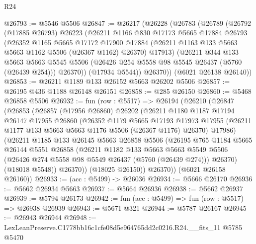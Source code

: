 \begin{lexlean}{R24}
\begin{coremodule}
@26793 := @5546 @5506
@26847 := @26217
    (@26228
      (@26783
        (@26789
          (@26792
            (@17885 @26793)
            @26223
            (@26211
              @1166
              @830
              @17173
              @5665
              @17884
              @26793
              (@26352
                @1165
                @5665
                @17172
                @17900
                @17884
                (@26211 @1163 @133 @5663 @5663 @1162 @5506 (@26367 @1162) @26370)
                @17913)
              (@26211
                @344
                @133
                @5663
                @5663
                @5545
                @5506
                (@26426 @254 @5558 @98 @5545 @26437 (@5760 (@26439 @254)))
                @26370))
            (@17934 @5544))
          @26370))
      (@6021 @26138 @26140))
@26853 := @26211 @1189 @133 @26152 @5663 @26202 @5506
@26857 := @26195 @436 @1188 @26148 @26151
@26858 := @285 @26150
@26860 := @5468 @26858 @5506
@26932 := fun (row : @5517) =>
  @26194
    (@26210
      (@26847
        (@26853
          (@26857
            (@17956 @26860)
            @26202
            (@26211
              @1180
              @1187
              @17194
              @26147
              @17955
              @26860
              (@26352
                @1179
                @5665
                @17193
                @17973
                @17955
                (@26211 @1177 @133 @5663 @5663 @1176 @5506 (@26367 @1176) @26370)
                @17986)
              (@26211
                @1185
                @133
                @26145
                @5663
                @26858
                @5506
                (@26195
                  @765
                  @1184
                  @5665
                  @26144
                  @5551
                  @26858
                  (@26211
                    @1182
                    @133
                    @5663
                    @5663
                    @5549
                    @5506
                    (@26426 @274 @5558 @98 @5549 @26437 (@5760 (@26439 @274)))
                    @26370)
                  (@18018 @5548))
                @26370))
            (@18025 @26150))
          @26370))
      (@6021 @26158 @26160))
@26933 := (acc : @5499) -> @26036
@26934 := @5666 @26170
@26936 := @5662 @26934 @5663
@26937 := @5664 @26936
@26938 := @5662 @26937
@26939 := @5794 @26173
@26942 := fun (acc : @5499) => fun (row : @5517) => @26938 @26939
@26943 := @5671 @321
@26944 := @5787 @26167
@26945 := @26943 @26944
@26948 := LexLeanPreserve.C1778bb16c1cfe08d5e964765dd2c0216.R24.__fits_11 @5785 @5470

\end{coremodule}
\end{lexlean}
